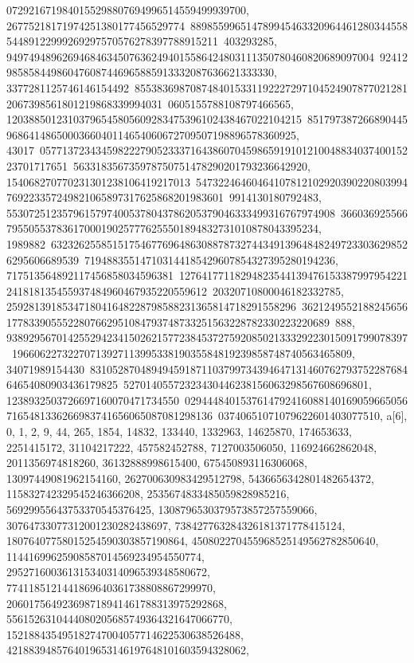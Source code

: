 {{{0729216719840155298807694996514559499939700, 26775218171974251380177456529774\
88985599651478994546332096446128034455854489122999269297570576278397788915211\
403293285, 949749489626946846345076362494015586424803111350780460820689097004\
92412985858449860476087446965885913332087636621333330, 3377281125746146154492\
85538369870874840153311922272971045249078770212812067398561801219868339994031\
0605155788108797466565, 12038850123103796545805609283475396102438467022104215\
8517973872668904459686414865000366040114654060672709507198896578360925, 43017\
05771372343459822279052333716438607045986591910121004883403740015223701717651\
563318356735978750751478290201793236642920, 154068270770231301238106419217013\
54732246460464107812102920390220803994769223357249821065897317625868201983601\
9914130180792483, 55307251235796157974005378043786205379046333499316767974908\
36603692556679550553783617000190257776255501894832731010878043395234, 1989882\
63232625585151754677696486308878732744349139648482497233036298526295606689539\
719488355147103144185429607854327395280194236, 717513564892117456858034596381\
12764177118294823544139476153387997954221241818135455937484960467935220559612\
20320710800046182332785, 2592813918534718041648228798588231365814718291558296\
36212495521882456561778339055522807662951084793748733251563228782330223220689\
888, 938929567014255294234150262157723845372759208502133329223015091799078397\
1966062273227071392711399533819035584819239858748740563465809, 34071989154430\
83105287048949459187110379973439464713146076279375228768464654080903436179825\
52701405572323430446238156063298567608696801, 1238932503726697160070471734550\
02944484015376147924160881401690596650567165481336266983741656065087081298136\
03740651071079622601403077510}}, {a[6], {0, 1, 2, 9, 44, 265, 1854, 14832, 
   133440, 1332963, 14625870, 174653633, 2251415172, 31104217222, 
   457582452788, 7127003506050, 116924662862048, 2011356974818260, 
   36132888998615400, 675450893116306068, 13097449081962154160, 
   262700630983429512798, 5436656342801482654372, 115832742329545246366208, 
   2535674833485059828985216, 56929955643753370545376425, 
   1308796530379573857257559066, 30764733077312001230282438697, 
   738427763284326181371778415124, 18076407758015254590303857190864, 
   450802270455968525149562782850640, 11441699625908587014569234954550774, 
   295271600361315340314096539348580672, 
   7741185121441869640361738808867299970, 
   206017564923698718941461788313975292868, 
   5561526310444080205685749364321647066770, 
   152188435495182747004057714622530638526488, 
   4218839485764019653146197648101603594328062, 
}}}
